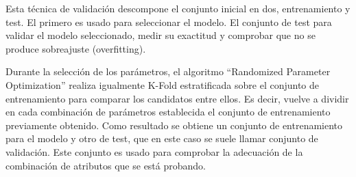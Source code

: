 Esta técnica de validación descompone el conjunto inicial en dos, entrenamiento y test. El primero es usado para seleccionar el modelo. El conjunto de test para validar el modelo seleccionado, medir su exactitud y comprobar que no se produce sobreajuste (overfitting).

Durante la selección de los parámetros, el algoritmo ``Randomized Parameter Optimization'' realiza igualmente K-Fold estratificada sobre el conjunto de entrenamiento para comparar los candidatos entre ellos. Es decir, vuelve a dividir en cada combinación de parámetros establecida el conjunto de entrenamiento previamente obtenido. Como resultado se obtiene un conjunto de entrenamiento para el modelo y otro de test, que en este caso se suele llamar conjunto de validación. Este conjunto es usado para comprobar la adecuación de la combinación de atributos que se está probando.
